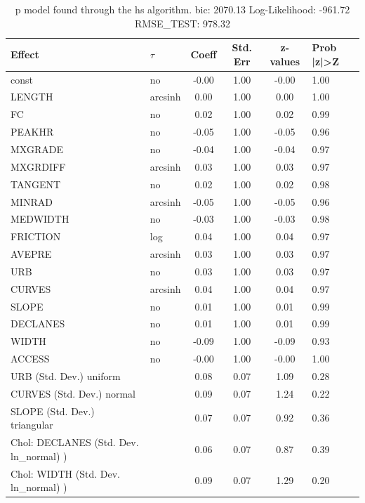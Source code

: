 \begin{table}
	\caption{p model found through the hs algorithm. bic: 2070.13 Log-Likelihood: -961.72 RMSE_TEST: 978.32}
	\begin{center}
		\begin{tabular}{|l|l|c|c|c|l|}
			\hline
			Effect & $\tau$ & Coeff & Std. Err & z-values & Prob |z|>Z \\
			\hline
			const & no & -0.00 & 1.00 & -0.00 & 1.00 \\
			\hline
			LENGTH & arcsinh & 0.00 & 1.00 & 0.00 & 1.00 \\
			\hline
			FC & no & 0.02 & 1.00 & 0.02 & 0.99 \\
			\hline
			PEAKHR & no & -0.05 & 1.00 & -0.05 & 0.96 \\
			\hline
			MXGRADE & no & -0.04 & 1.00 & -0.04 & 0.97 \\
			\hline
			MXGRDIFF & arcsinh & 0.03 & 1.00 & 0.03 & 0.97 \\
			\hline
			TANGENT & no & 0.02 & 1.00 & 0.02 & 0.98 \\
			\hline
			MINRAD & arcsinh & -0.05 & 1.00 & -0.05 & 0.96 \\
			\hline
			MEDWIDTH & no & -0.03 & 1.00 & -0.03 & 0.98 \\
			\hline
			FRICTION & log & 0.04 & 1.00 & 0.04 & 0.97 \\
			\hline
			AVEPRE & arcsinh & 0.03 & 1.00 & 0.03 & 0.97 \\
			\hline
			URB & no & 0.03 & 1.00 & 0.03 & 0.97 \\
			\hline
			CURVES & arcsinh & 0.04 & 1.00 & 0.04 & 0.97 \\
			\hline
			SLOPE & no & 0.01 & 1.00 & 0.01 & 0.99 \\
			\hline
			DECLANES & no & 0.01 & 1.00 & 0.01 & 0.99 \\
			\hline
			WIDTH & no & -0.09 & 1.00 & -0.09 & 0.93 \\
			\hline
			ACCESS & no & -0.00 & 1.00 & -0.00 & 1.00 \\
			\hline
			URB (Std. Dev.) uniform &  & 0.08 & 0.07 & 1.09 & 0.28 \\
			\hline
			CURVES (Std. Dev.) normal &  & 0.09 & 0.07 & 1.24 & 0.22 \\
			\hline
			SLOPE (Std. Dev.) triangular &  & 0.07 & 0.07 & 0.92 & 0.36 \\
			\hline
			 Chol: DECLANES (Std. Dev. ln_normal) ) &  & 0.06 & 0.07 & 0.87 & 0.39 \\
			\hline
			 Chol: WIDTH (Std. Dev. ln_normal) ) &  & 0.09 & 0.07 & 1.29 & 0.20 \\

\end{tabular}
\end{center}
\end{table}
